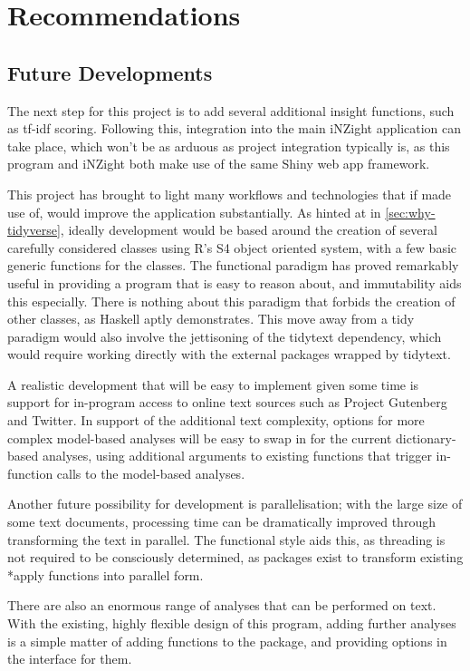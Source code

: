 \message{ !name(jason-cairns-dissertation.tex)}\documentclass[11pt, a4paper, titlepage]{report}
\begin{document}
\section{Recommendations}\label{sec:recommendations}

\subsection{Future Developments}

The next step for this project is to add several additional insight
functions, such as tf-idf scoring. Following this, integration into
the main iNZight application can take place, which won't be as arduous
as project integration typically is, as this program and iNZight both
make use of the same Shiny web app framework.

This project has brought to light many workflows and technologies that
if made use of, would improve the application substantially. As hinted
at in \cref{sec:why-tidyverse}, ideally development would be based
around the creation of several carefully considered classes using R's
S4 object oriented system, with a few basic generic functions for the
classes. The functional paradigm has proved remarkably useful in
providing a program that is easy to reason about, and immutability
aids this especially. There is nothing about this paradigm that
forbids the creation of other classes, as Haskell aptly
demonstrates\autocite{Hudak07ahistory}. This move away from a tidy
paradigm would also involve the jettisoning of the tidytext
dependency, which would require working directly with the external
packages wrapped by tidytext.

A realistic development that will be easy to implement given some time
is support for in-program access to online text sources such as
Project Gutenberg and Twitter. In support of the additional text
complexity, options for more complex model-based analyses will be easy
to swap in for the current dictionary-based analyses, using additional
arguments to existing functions that trigger in-function calls to the
model-based analyses.

Another future possibility for development is parallelisation; with
the large size of some text documents, processing time can be
dramatically improved through transforming the text in parallel. The
functional style aids this, as threading is not required to be
consciously determined, as packages exist to transform existing *apply
functions into parallel form.

There are also an enormous range of analyses that can be performed on
text. With the existing, highly flexible design of this program,
adding further analyses is a simple matter of adding functions to the
package, and providing options in the interface for them.
\end{document}

